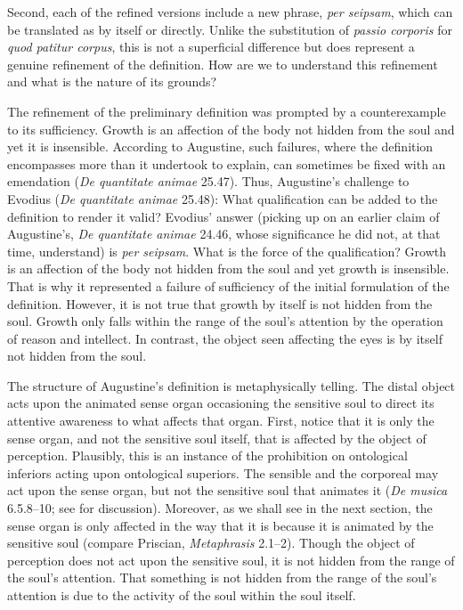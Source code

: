 \documentclass[12pt]{article}
\begin{document}
Second, each of the refined versions include a new phrase, \emph{per seipsam}, which can be translated as by itself or directly. Unlike the substitution of \emph{passio corporis} for \emph{quod patitur corpus}, this is not a superficial difference but does represent a genuine refinement of the definition. How are we to understand this refinement and what is the nature of its grounds?

The refinement of the preliminary definition was prompted by a counterexample to its sufficiency. Growth is an affection of the body not hidden from the soul and yet it is insensible. According to Augustine, such failures, where the definition encompasses more than it undertook to explain, can sometimes be fixed with an emendation (\emph{De quantitate animae} 25.47). Thus, Augustine's challenge to Evodius (\emph{De quantitate animae} 25.48): What qualification can be added to the definition to render it valid? Evodius' answer (picking up on an earlier claim of Augustine's, \emph{De quantitate animae} 24.46, whose significance he did not, at that time, understand) is \emph{per seipsam}. What is the force of the qualification? Growth is an affection of the body not hidden from the soul and yet growth is insensible. That is why it represented a failure of sufficiency of the initial formulation of the definition. However, it is not true that growth by itself is not hidden from the soul. Growth only falls within the range of the soul's attention by the operation of reason and intellect. In contrast, the object seen affecting the eyes is by itself not hidden from the soul.

The structure of Augustine's definition is metaphysically telling. The distal object acts upon the animated sense organ occasioning the sensitive soul to direct its attentive awareness to what affects that organ. First, notice that it is only the sense organ, and not the sensitive soul itself, that is affected by the object of perception. Plausibly, this is an instance of the prohibition on ontological inferiors acting upon ontological superiors. The sensible and the corporeal may act upon the sense organ, but not the sensitive soul that animates it (\emph{De musica} 6.5.8–10; see \citealt{Silva:2014bh} for discussion). Moreover, as we shall see in the next section, the sense organ is only affected in the way that it is because it is animated by the sensitive soul (compare Priscian, \emph{Metaphrasis} 2.1--2). Though the object of perception does not act upon the sensitive soul, it is not hidden from the range of the soul's attention. That something is not hidden from the range of the soul’s attention is due to the activity of the soul within the soul itself.
\end{document}

